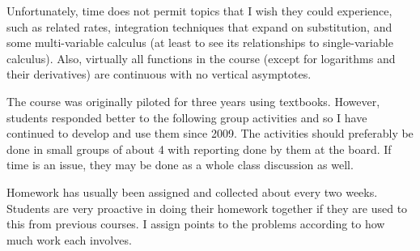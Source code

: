 \documentclass{ximera}
\begin{document}
Unfortunately, time does not permit topics that I wish they could experience, such as related rates, integration techniques that expand on substitution, and some multi-variable calculus (at least to see its relationships to single-variable calculus).  Also, virtually all functions in the course (except for logarithms and their derivatives) are continuous with no vertical asymptotes.

The course was originally piloted for three years using textbooks.  However, students responded better to the following group activities and so I have continued to develop and use them since 2009.  The activities should preferably be done in small groups of about 4 with reporting done by them at the board.  If time is an issue, they may be done as a whole class discussion as well.

Homework has usually been assigned and collected about every two weeks. Students are very proactive in doing their homework together if they are used to this from previous courses. I assign points to the problems according to how much work each involves.
\end{document}
